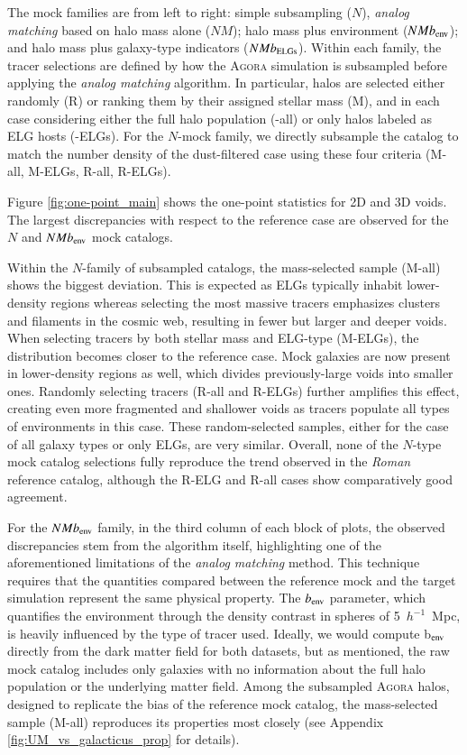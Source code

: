 \documentclass[]{aa} %
\begin{document}
The mock families are from left to right: simple subsampling ($N$), \emph{analog matching} based on halo mass alone ($NM$); halo mass plus environment ($NMb_{\rm env}$); and halo mass plus galaxy-type indicators ($NMb_{\rm ELGs}$). 
Within each family, the tracer selections are defined by how the \textsc{Agora} simulation is subsampled before applying the \emph{analog matching} algorithm. In particular, halos are selected either randomly (R) or ranking them by their assigned stellar mass (M), and in each case considering either the full halo population (-all) or only halos labeled as ELG hosts (-ELGs). For the $N$-mock family, we directly subsample the catalog to match the number density of the dust-filtered case using these four criteria  (M-all, M-ELGs, R-all, R-ELGs).

Figure \ref{fig:one-point_main} shows the one-point statistics for 2D and 3D voids. The largest discrepancies with respect to the reference case are observed for the $N$ and $NMb_{\rm env}$ mock catalogs. 

Within the $N$-family of subsampled catalogs, the mass-selected sample (M-all) shows the biggest deviation. This is expected as ELGs typically inhabit lower-density regions whereas selecting the most massive tracers emphasizes clusters and filaments in the cosmic web, resulting in fewer but larger and deeper voids. When selecting tracers by both stellar mass and ELG-type (M-ELGs), the distribution becomes closer to the reference case. Mock galaxies are now present in lower-density regions as well, which divides previously-large voids into smaller ones. Randomly selecting tracers (R-all and R-ELGs) further amplifies this effect, creating even more fragmented and shallower voids as tracers populate all types of environments in this case. These random-selected samples, either for the case of all galaxy types or only ELGs, are very similar. Overall, none of the $N$-type mock catalog selections fully reproduce the trend observed in the \emph{Roman} reference catalog, although the R-ELG and R-all cases show comparatively good agreement.

For the $NMb_{\rm env}$ family, in the third column of each block of plots, the observed discrepancies stem from the algorithm itself, highlighting one of the aforementioned limitations of the \emph{analog matching} method. This technique requires that the quantities compared between the reference mock and the target simulation represent the same physical property. The $b_{\rm env}$ parameter, which quantifies the environment through the density contrast in spheres of 5~$h^{-1}$~Mpc, is heavily influenced by the type of tracer used. Ideally, we would compute b$_{\rm env}$ directly from the dark matter field for both datasets, but as mentioned, the raw mock catalog includes only galaxies with no information about the full halo population or the underlying matter field. Among the subsampled \textsc{Agora} halos, designed to replicate the bias of the reference mock catalog, the mass-selected sample (M-all) reproduces its properties most closely (see Appendix \ref{fig:UM_vs_galacticus_prop} for details).
\end{document}
